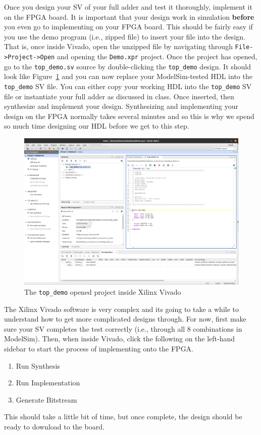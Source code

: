 \documentclass{article}
\begin{document}
Once you design your SV of your full adder
and test it thoroughly, implement it on the
FPGA board.  It is important that your design work in simulation
\textbf{before} you even go to implementing on your FPGA board.
This should be fairly easy if you use the demo program
(i.e., zipped file) to insert your file into the design.
That is, once inside Vivado, open the unzipped file by navigating
through \verb!File->Project->Open! and opening the \verb!Demo.xpr!
project.  Once the project has opened, go to the \verb!top_demo.sv!
source by double-clicking the \verb!top_demo!
design.  It should look like Figure~\ref{demo} and 
you can now replace your ModelSim-tested HDL into the
\verb!top_demo! SV file. You can either copy your working HDL into the
\verb!top_demo! SV file or instantiate your full adder as discussed in
class.  Once
inserted, then synthesize and implement your design.  Synthesizing and
implementing your design on the FPGA normally takes several minutes
and so this is why we spend so much time designing our HDL before we
get to this step.
\begin{figure}
  \centering
  \includegraphics[scale=0.2]{top_demo.png}
  \cprotect\caption{The \verb!top_demo! opened project inside Xilinx Vivado}
  \label{demo}
\end{figure}

The Xilinx Vivado software is very complex and its going to take a
while to understand how to get more complicated designs through.  For
now, first make sure your SV completes the test correctly (i.e.,
through all $8$ combinations in ModelSim).  Then, when inside Vivado,
click the
following on the left-hand sidebar to start the process of
implementing onto the FPGA.
\begin{enumerate}
\item Run Synthesis
\item Run Implementation
\item Generate Bitstream
\end{enumerate}
This should
take a little bit of time, but once complete, the design should be
ready to download to the board.
\end{document}
